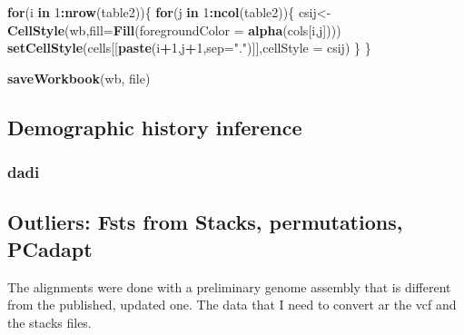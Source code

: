 \documentclass[]{article}
\newenvironment{Shaded}{\begin{snugshade}}{\end{snugshade}}
\newcommand{\KeywordTok}[1]{\textcolor[rgb]{0.13,0.29,0.53}{\textbf{#1}}}
\newcommand{\DataTypeTok}[1]{\textcolor[rgb]{0.13,0.29,0.53}{#1}}
\newcommand{\DecValTok}[1]{\textcolor[rgb]{0.00,0.00,0.81}{#1}}
\newcommand{\StringTok}[1]{\textcolor[rgb]{0.31,0.60,0.02}{#1}}
\newcommand{\ControlFlowTok}[1]{\textcolor[rgb]{0.13,0.29,0.53}{\textbf{#1}}}
\newcommand{\OperatorTok}[1]{\textcolor[rgb]{0.81,0.36,0.00}{\textbf{#1}}}
\newcommand{\NormalTok}[1]{#1}
\begin{document}
\begin{Shaded}
\begin{Highlighting}[]
\ControlFlowTok{for}\NormalTok{(i }\ControlFlowTok{in} \DecValTok{1}\OperatorTok{:}\KeywordTok{nrow}\NormalTok{(table2))\{}
  \ControlFlowTok{for}\NormalTok{(j }\ControlFlowTok{in} \DecValTok{1}\OperatorTok{:}\KeywordTok{ncol}\NormalTok{(table2))\{}
\NormalTok{    csij<-}\KeywordTok{CellStyle}\NormalTok{(wb,}\DataTypeTok{fill=}\KeywordTok{Fill}\NormalTok{(}\DataTypeTok{foregroundColor =} \KeywordTok{alpha}\NormalTok{(cols[i,j])))}
    \KeywordTok{setCellStyle}\NormalTok{(cells[[}\KeywordTok{paste}\NormalTok{(i}\OperatorTok{+}\DecValTok{1}\NormalTok{,j}\OperatorTok{+}\DecValTok{1}\NormalTok{,}\DataTypeTok{sep=}\StringTok{"."}\NormalTok{)]],}\DataTypeTok{cellStyle =}\NormalTok{ csij)}
\NormalTok{  \}}
\NormalTok{\}}

\KeywordTok{saveWorkbook}\NormalTok{(wb, file)}
\end{Highlighting}
\end{Shaded}

\subsection{Demographic history
inference}\label{demographic-history-inference}

\subsubsection{dadi}\label{dadi}

\subsection{Outliers: Fsts from Stacks, permutations,
PCadapt}\label{outliers-fsts-from-stacks-permutations-pcadapt}

The alignments were done with a preliminary genome assembly that is
different from the published, updated one. The data that I need to
convert ar the vcf and the stacks files.
\end{document}
